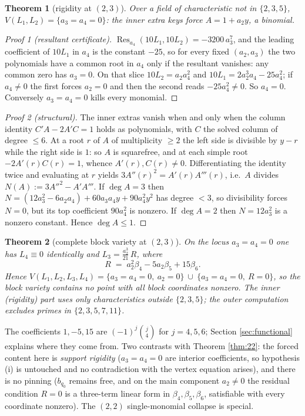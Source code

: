 \documentclass[11pt]{article}
\newtheorem{theorem}{Theorem}[section]
\theoremstyle{definition}
\theoremstyle{remark}
\begin{document}
\begin{theorem}[rigidity at $(2,3)$]\label{thm:23}
Over a field of characteristic not in $\{2,3,5\}$, $V(L_1,L_2)=\{a_3=a_4=0\}$: the inner extra keys force $A=1+a_2y$, a binomial.
\end{theorem}

\begin{proof}[Proof 1 (resultant certificate)]
$\operatorname{Res}_{a_4}(10L_1,10L_2)=-3200\,a_3^7$, and the leading coefficient of $10L_1$ in $a_4$ is the constant $-25$, so for every fixed $(a_2,a_3)$ the two polynomials have a common root in $a_4$ only if the resultant vanishes: any common zero has $a_3=0$. On that slice $10L_2=a_2a_4^2$ and $10L_1=2a_2^3a_4-25a_4^2$; if $a_4\neq0$ the first forces $a_2=0$ and then the second reads $-25a_4^2\neq0$. So $a_4=0$. Conversely $a_3=a_4=0$ kills every monomial.
\end{proof}

\begin{proof}[Proof 2 (structural)]
The inner extras vanish when and only when the column identity $C'A-2A'C=1$ holds as polynomials, with $C$ the solved column of degree $\leq 6$. At a root $r$ of $A$ of multiplicity $\geq2$ the left side is divisible by $y-r$ while the right side is $1$: so $A$ is squarefree, and at each simple root $-2A'(r)C(r)=1$, whence $A'(r),C(r)\neq0$. Differentiating the identity twice and evaluating at $r$ yields $3A''(r)^2=A'(r)A'''(r)$, i.e.\ $A$ divides $N(A):=3A''^2-A'A'''$. If $\deg A=3$ then $N=(12a_3^2-6a_2a_4)+60a_3a_4y+90a_4^2y^2$ has degree $<3$, so divisibility forces $N=0$, but its top coefficient $90a_4^2$ is nonzero. If $\deg A=2$ then $N=12a_3^2$ is a nonzero constant. Hence $\deg A\leq 1$.
\end{proof}

\begin{theorem}[complete block variety at $(2,3)$]\label{thm:23full}
On the locus $a_3=a_4=0$ one has $L_4\equiv 0$ identically and $L_3=\frac{a_2^3}{21}\,R$, where
\[
R \;=\; a_2^2\beta_4-5a_2\beta_5+15\beta_6 .
\]
Hence $V(L_1,L_2,L_3,L_4)=\{a_3=a_4=0,\ a_2=0\}\ \cup\ \{a_3=a_4=0,\ R=0\}$, so the block variety contains no point with all block coordinates nonzero. The inner (rigidity) part uses only characteristics outside $\{2,3,5\}$; the outer computation excludes primes in $\{2,3,5,7,11\}$.
\end{theorem}

The coefficients $1,-5,15$ are $(-1)^j\binom{j}{4}$ for $j=4,5,6$; Section \ref{sec:functional} explains where they come from. Two contrasts with Theorem \ref{thm:22}: the forced content here is \emph{support rigidity} ($a_3=a_4=0$ are interior coefficients, so hypothesis (i) is untouched and no contradiction with the vertex equation arises), and there is no pinning ($b_{q_0}$ remains free, and on the main component $a_2\neq0$ the residual condition $R=0$ is a three-term linear form in $\beta_4,\beta_5,\beta_6$, satisfiable with every coordinate nonzero). The $(2,2)$ single-monomial collapse is special.
\end{document}
